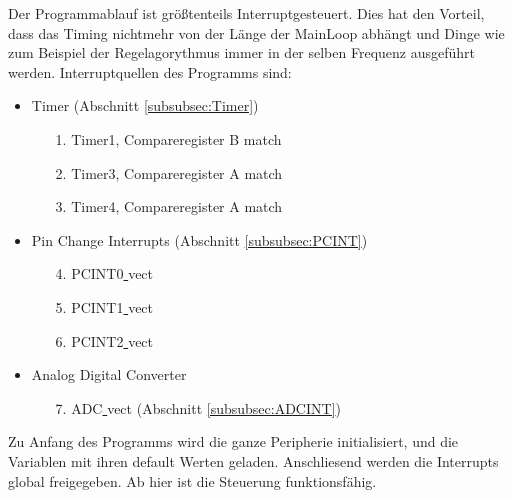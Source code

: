 \documentclass[a4paper, 11pt]{report}
\begin{document}
Der Programmablauf ist größtenteils Interruptgesteuert.
			Dies hat den Vorteil, dass das Timing nichtmehr von der Länge der MainLoop abhängt und Dinge wie zum  Beispiel der Regelagorythmus immer in der selben Frequenz ausgeführt werden.
			Interruptquellen des Programms sind:
			\begin{itemize}
				\item Timer  (Abschnitt \ref{subsubsec:Timer})
				\begin{itemize}
					\item[1.] Timer1, Compareregister B match
					\item[2.] Timer3, Compareregister A match
					\item[3.] Timer4, Compareregister A match
				\end{itemize}
				\item Pin Change Interrupts (Abschnitt \ref{subsubsec:PCINT})
				\begin{itemize}
					\item[4.] PCINT0\underline{ }vect
					\item[5.] PCINT1\underline{ }vect
					\item[6.] PCINT2\underline{ }vect
				\end{itemize}
				\item Analog Digital Converter
				\begin{itemize}
					\item[7.] ADC\underline{ }vect  (Abschnitt \ref{subsubsec:ADCINT})
				\end{itemize}

			\end{itemize}
			\newpage
			Zu Anfang des Programms wird die ganze Peripherie initialisiert, und die Variablen mit ihren default Werten geladen.
			Anschliesend werden die Interrupts global freigegeben. Ab hier ist die Steuerung funktionsfähig.
\end{document}
